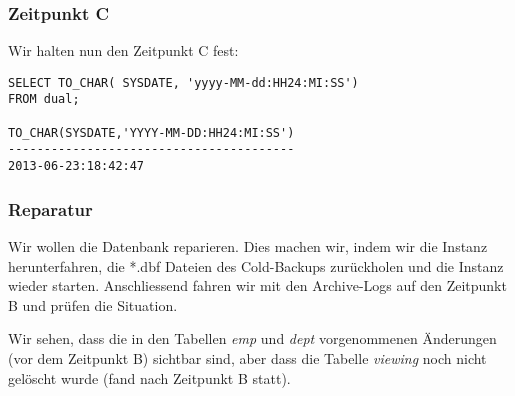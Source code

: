 \documentclass[11pt,a4paper,parskip=half]{scrartcl}
\begin{document}
\subsubsection{Zeitpunkt C}
Wir halten nun den Zeitpunkt C fest:
\begin{lstlisting}
SELECT TO_CHAR( SYSDATE, 'yyyy-MM-dd:HH24:MI:SS')
FROM dual;

TO_CHAR(SYSDATE,'YYYY-MM-DD:HH24:MI:SS')
----------------------------------------
2013-06-23:18:42:47     
\end{lstlisting}

\subsubsection{Reparatur}
Wir wollen die Datenbank reparieren. Dies machen wir, indem wir die Instanz herunterfahren, die *.dbf Dateien des Cold-Backups zurückholen und die Instanz wieder starten. Anschliessend fahren wir mit den Archive-Logs auf den Zeitpunkt B und prüfen die Situation.

Wir sehen, dass die in den Tabellen \emph{emp} und \emph{dept} vorgenommenen Änderungen (vor dem Zeitpunkt B) sichtbar sind, aber dass die Tabelle \emph{viewing} noch nicht gelöscht wurde (fand nach Zeitpunkt B statt).
\end{document}
